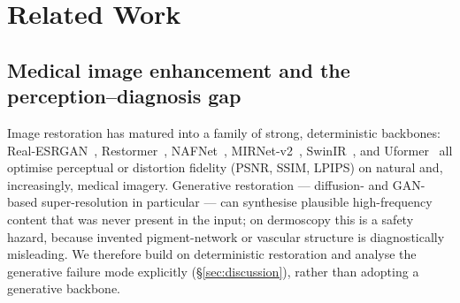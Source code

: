 %

\section{Related Work}
\label{sec:related}

\subsection{Medical image enhancement and the perception--diagnosis gap}
\label{subsec:rel-enhancement}

Image restoration has matured into a family of strong, deterministic backbones:
Real-ESRGAN~\citep{wang2021realesrgan}, Restormer~\citep{zamir2022restormer},
NAFNet~\citep{chen2022simple}, MIRNet-v2~\citep{zamir2022mirnetv2},
SwinIR~\citep{liang2021swinir}, and Uformer~\citep{wang2022uformer} all optimise
perceptual or distortion fidelity (PSNR, SSIM, LPIPS) on natural and, increasingly,
medical imagery. Generative restoration --- diffusion- and GAN-based super-resolution
in particular --- can synthesise plausible high-frequency content that was never
present in the input; on dermoscopy this is a safety hazard, because invented
pigment-network or vascular structure is diagnostically misleading. We therefore
build on deterministic restoration and analyse the generative failure mode
explicitly (\S\ref{sec:discussion}), rather than adopting a generative backbone.

